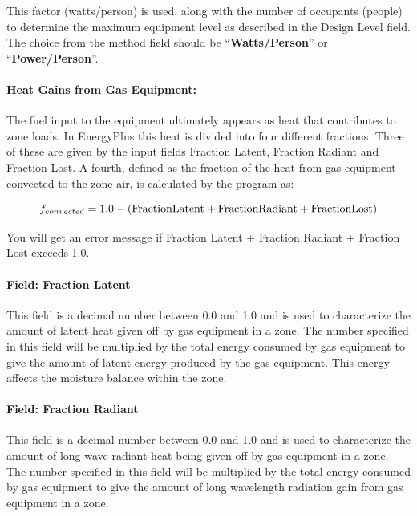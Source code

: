 This factor (watts/person) is used, along with the number of occupants (people) to determine the maximum equipment level as described in the Design Level field. The choice from the method field should be ``\textbf{Watts/Person}'' or ``\textbf{Power/Person}''.

\paragraph{Heat Gains from Gas Equipment:}\label{heat-gains-from-gas-equipment-gas-definition}

The fuel input to the equipment ultimately appears as heat that contributes to zone loads. In EnergyPlus this heat is divided into four different fractions. Three of these are given by the input fields Fraction Latent, Fraction Radiant and Fraction Lost. A fourth, defined as the fraction of the heat from gas equipment convected to the zone air, is calculated by the program as:

\begin{equation}
  f_{convected} = 1.0 - (\rm{Fraction Latent} + \rm{Fraction Radiant} + \rm{Fraction Lost})
\end{equation}

You will get an error message if Fraction Latent + Fraction Radiant + Fraction Lost exceeds 1.0.

\paragraph{Field: Fraction Latent}\label{field-fraction-latent-1-gas-definition}

This field is a decimal number between 0.0 and 1.0 and is used to characterize the amount of latent heat given off by gas equipment in a zone. The number specified in this field will be multiplied by the total energy consumed by gas equipment to give the amount of latent energy produced by the gas equipment. This energy affects the moisture balance within the zone.

\paragraph{Field: Fraction Radiant}\label{field-fraction-radiant-3-gas-definition}

This field is a decimal number between 0.0 and 1.0 and is used to characterize the amount of long-wave radiant heat being given off by gas equipment in a zone. The number specified in this field will be multiplied by the total energy consumed by gas equipment to give the amount of long wavelength radiation gain from gas equipment in a zone.


